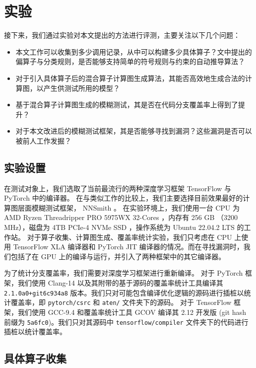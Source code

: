 
\chapter{实验}

接下来，我们通过实验对本文提出的方法进行评测，主要关注以下几个问题：

\begin{itemize}
    \item 本文工作可以收集到多少调用记录，从中可以构建多少具体算子？文中提出的偏算子与分类规则，是否能够支持简单的符号规则与约束的自动推导算法？
    \item 对于引入具体算子后的混合算子计算图生成算法，其能否高效地生成合法的计算图，以产生供测试所用的模型？
    \item 基于混合算子计算图生成的模糊测试，其是否在代码分支覆盖率上得到了提升？
    \item 对于本文改进后的模糊测试框架，其是否能够寻找到漏洞？这些漏洞是否可以被前人工作发掘？
\end{itemize}

\section{实验设置}

在测试对象上，我们选取了当前最流行的两种深度学习框架 TensorFlow 与 PyTorch 中的编译器。
在与类似工作的比较上，我们主要选择目前效果最好的计算图层面模糊测试框架， NNSmith 。
在实验环境上，我们使用一台 CPU 为 AMD Ryzen Threadripper PRO 5975WX 32-Cores ，内存有 256 GB （3200 MHz），磁盘为 4TB PCIe-4 NVMe SSD ，操作系统为 Ubuntu 22.04.2 LTS 的工作站。
对于算子收集、计算图生成、覆盖率统计实验，我们只考虑在 CPU 上使用 TensorFlow XLA 编译器和 PyTorch JIT 编译器的情况。而在寻找漏洞时，我们包括了在 GPU 上的编译与运行，并引入了两种框架中的其它编译器。

为了统计分支覆盖率，我们需要对深度学习框架进行重新编译。
对于 PyTorch 框架，我们使用 Clang-14 以及其附带的基于源码的覆盖率统计工具\cite{clang14_cov}编译其 \texttt{2.1.0a0+git6c934a8} 版本。我们只对可能包含编译优化逻辑的源码进行插桩以统计覆盖率，即 \texttt{pytorch/csrc} 和 \texttt{aten/} 文件夹下的源码。
对于 TensorFlow 框架，我们使用 GCC-9.4 和覆盖率统计工具 GCOV\cite{gcov} 编译其 2.12 开发版 (git hash 前缀为 \texttt{5a6fc0})。我们只对其源码中 \texttt{tensorflow/compiler} 文件夹下的代码进行插桩以统计覆盖率。

\section{具体算子收集}

